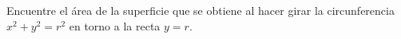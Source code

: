 \item Encuentre el área de la superficie que se obtiene al hacer girar la circunferencia $x^2 + y^2 = r^2$ en torno a la recta $y = r$.
